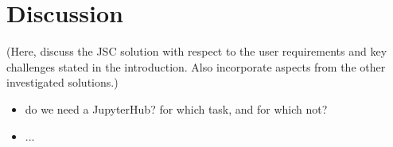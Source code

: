 \section{Discussion}

(Here, discuss the JSC solution with respect to the user requirements and key challenges stated in the introduction. Also incorporate aspects from the other investigated solutions.)

\begin{itemize}
  \item do we need a JupyterHub? for which task, and for which not?
  \item ...
\end{itemize}
